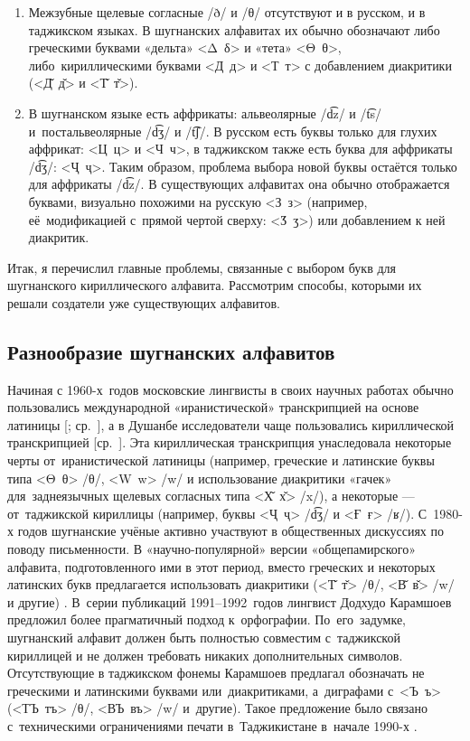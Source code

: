 \begin{enumerate}[(1)]
  \item Межзубные щелевые согласные /ð/ и /θ/ отсутствуют и в русском, и в таджикском языках. В шугнанских алфавитах их обычно обозначают либо греческими буквами «дельта» <Δ~δ> и «тета» <Θ~θ>, либо~кириллическими буквами <Д~д> и <Т~т> с добавлением диакритики (<Д̌~д̌> и <Т̌~т̌>).

  \item В шугнанском языке есть аффрикаты: альвеолярные /d͡z/ и /t͡s/ и~постальвеолярные /d͡ʒ/ и /t͡ʃ/. В русском есть буквы только для глухих аффрикат: <Ц~ц> и <Ч~ч>, в таджикском также есть буква для аффрикаты /d͡ʒ/: <Ҷ~ҷ>. Таким образом, проблема выбора новой буквы остаётся только для аффрикаты /d͡z/. В существующих алфавитах она обычно отображается буквами, визуально похожими на русскую <З~з> (например, её~модификацией с~прямой чертой сверху: <Ӡ~ӡ>) или добавлением к ней диакритик.

\end{enumerate}

Итак, я перечислил главные проблемы, связанные с выбором букв для шугнанского кириллического алфавита. Рассмотрим способы, которыми их решали создатели уже существующих алфавитов.

\subsection{Разнообразие шугнанских алфавитов} \label{ortho-diversity}

Начиная с 1960-х~годов московские лингвисты в своих научных работах обычно пользовались международной «иранистической» транскрипцией на основе латиницы [\cite{edelman1963_transcription}; ср.~\cites{sokolova1953}{zarubin1960}{pakhalina1969_pamir}], а в Душанбе исследователи чаще пользовались кириллической транскрипцией [ср.~\cites{karamshoev1963}{zabonkhoi_pamir1972}{pomirshinosi1975}{bakhtibekov1979}]. Эта кириллическая транскрипция унаследовала некоторые черты от~иранистической латиницы (например, греческие и латинские буквы типа <Θ~θ> /θ/, <W~w> /w/ и использование диакритики «гачек» для~заднеязычных щелевых согласных типа <Х̌~х̌> /x/), а некоторые — от~таджикской кириллицы (например, буквы <Ҷ~ҷ> /d͡ʒ/ и <Ғ~ғ> /ʁ/). С~1980-х годов шугнанские учёные активно участвуют в общественных дискуссиях по поводу письменности. В «научно-популярной» версии «общепамирского» алфавита, подготовленного ими в этот период, вместо греческих и некоторых латинских букв предлагается использовать диакритики (<Т̌~т̌> /θ/, <В̌~в̌> /w/ и другие) \parencite[262–263]{dodykhudoeva2020_ortho}. В~серии публикаций 1991–1992~годов лингвист Додхудо Карамшоев предложил более прагматичный подход к~орфографии. По~его~задумке, шугнанский алфавит должен быть полностью совместим с~таджикской кириллицей и не должен требовать никаких дополнительных символов. Отсутствующие в таджикском фонемы Карамшоев предлагал обозначать не греческими и латинскими буквами или~диакритиками, а~диграфами с~<Ъ~ъ> (<ТЪ~тъ> /θ/, <ВЪ~въ> /w/ и~другие). Такое предложение было связано с~техническими ограничениями печати в~Таджикистане в~начале 1990-х \parencite[103]{edelman2016}.

